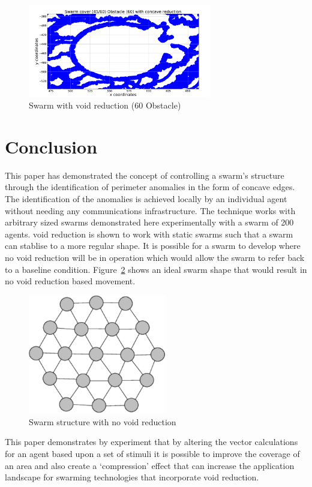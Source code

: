 \documentclass[preprint,12pt]{elsarticle}
\begin{document}
\begin{figure}
\begin{center}
\includegraphics[width=8cm]{figures/SWARMCOVER456060CONCAVE}
\end{center}
\caption{Swarm with void reduction (60 Obstacle)\label{voids:ObstacleTest3}}
\end{figure}

\section{Conclusion}\label{voids:Conclusion}
This paper has demonstrated the concept of controlling a swarm's structure through the identification of perimeter anomalies in the form of concave edges. The identification of the anomalies is achieved locally by an individual agent without needing any communications infrastructure. The technique works with arbitrary sized swarms demonstrated here experimentally with a swarm of 200 agents.
void reduction is shown to work with static swarms such that a swarm can stablise to a more regular shape. It is possible for a swarm to develop where no void reduction will be in operation which would allow the swarm to refer back to a baseline condition. Figure~\ref{voids:IdealSwarm} shows an ideal swarm shape that would result in no void reduction based movement. 
\begin{figure}
\begin{center}
\includegraphics[width=6cm]{figures/IdealSwarm}
\end{center}
\caption{Swarm structure with no void reduction\label{voids:IdealSwarm}}
\end{figure}
This paper demonstrates by experiment that by altering the vector calculations for an agent based upon a set of stimuli it is possible to improve the coverage of an area and also create a `compression' effect that can increase the application landscape for swarming technologies that incorporate void reduction.
\end{document}
